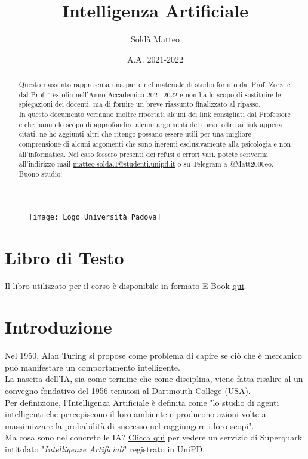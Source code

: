 \documentclass[12pt, a4paper]{article}
\title{Intelligenza Artificiale}
\author{Soldà Matteo }
\date{A.A. 2021-2022}
\begin{document}
\begin{figure}
    \centering
    \texttt{[image: Logo\_Università\_Padova]}
\end{figure}

\maketitle

\newpage
\begin{abstract}
    Questo riassunto rappresenta una parte del materiale di studio fornito dal Prof. Zorzi e dal Prof. Testolin nell'Anno Accademico 2021-2022 e non ha lo scopo di sostituire le spiegazioni dei docenti, ma di fornire un breve riassunto finalizzato al ripasso.\\ In questo documento verranno inoltre riportati alcuni dei link consigliati dal Professore e che hanno lo scopo di approfondire alcuni argomenti del corso; oltre ai link appena citati, ne ho aggiunti altri che ritengo possano essere utili per una migliore comprensione di alcuni argomenti che sono inerenti esclusivamente alla psicologia e non all'informatica.
    Nel caso fossero presenti dei refusi o errori vari, potete scrivermi all'indirizzo mail \href{mailto:matteo.solda.1@studenti.unipd.it}{matteo.solda.1@studenti.unipd.it} o su Telegram a @Matt2000eo.\\
    Buono studio!
\end{abstract}

\newpage
\tableofcontents

\newpage
\section{Libro di Testo}
Il libro utilizzato per il corso è disponibile in formato E-Book \href{https://infoscience.epfl.ch/record/63947}{qui}.

\section{Introduzione}
Nel 1950, Alan Turing si propose come problema di capire se ciò che è meccanico può manifestare un comportamento intelligente.\\
La nascita dell'IA, sia come termine che come disciplina, viene fatta risalire al un convegno fondativo del 1956 tenutosi al Dartmouth College (USA).\\
Per definizione, l'Intelligenza Artificiale è definita come "lo studio di agenti intelligenti che percepiscono il loro ambiente e producono azioni volte a massimizzare la probabilità di successo nel raggiungere i loro scopi". \\
Ma cosa sono nel concreto le IA? \href{https://www.raiplay.it/video/2018/08/Intelligenze-artificiali-29082018-f27a3b85-338c-46ba-97ae-2574c47a40a4.html}{Clicca qui} per vedere un servizio di Superquark intitolato "\textit{Intelligenze Artificiali}" registrato in UniPD.
\end{document}
